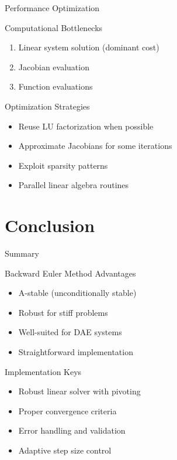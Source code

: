 \documentclass[10pt]{beamer}
\begin{document}
\begin{frame}{Performance Optimization}
\begin{block}{Computational Bottlenecks}
\begin{enumerate}
\item Linear system solution (dominant cost)
\item Jacobian evaluation
\item Function evaluations
\end{enumerate}
\end{block}

\begin{block}{Optimization Strategies}
\begin{itemize}
\item Reuse LU factorization when possible
\item Approximate Jacobians for some iterations
\item Exploit sparsity patterns
\item Parallel linear algebra routines
\end{itemize}
\end{block}
\end{frame}

\section{Conclusion}

\begin{frame}{Summary}
\begin{block}{Backward Euler Method Advantages}
\begin{itemize}
\item A-stable (unconditionally stable)
\item Robust for stiff problems
\item Well-suited for DAE systems
\item Straightforward implementation
\end{itemize}
\end{block}

\begin{block}{Implementation Keys}
\begin{itemize}
\item Robust linear solver with pivoting
\item Proper convergence criteria
\item Error handling and validation
\item Adaptive step size control
\end{itemize}
\end{block}
\end{frame}
\end{document}
